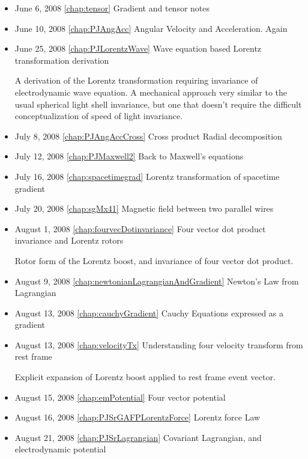 \begin{itemize}
\item June 6, 2008 \ref{chap:tensor} Gradient and tensor notes

\item June 10, 2008 \ref{chap:PJAngAcc} Angular Velocity and Acceleration.  Again

\item June 25, 2008 \ref{chap:PJLorentzWave} Wave equation based Lorentz transformation derivation

A derivation of the Lorentz transformation requiring invariance of electrodynamic wave equation.  A mechanical approach very similar to the usual spherical light shell invariance, but one that doesn't require the difficult conceptualization of speed of light invariance.\item July 8, 2008 \ref{chap:PJAngAccCross} Cross product Radial decomposition

\item July 12, 2008 \ref{chap:PJMaxwell2} Back to Maxwell's equations

\item July 16, 2008 \ref{chap:spacetimegrad} Lorentz transformation of spacetime gradient

\item July 20, 2008 \ref{chap:sgMx41} Magnetic field between two parallel wires

\item August 1, 2008 \ref{chap:fourvecDotinvariance} Four vector dot product invariance and Lorentz rotors

Rotor form of the Lorentz boost, and invariance of four vector dot product.\item August 9, 2008 \ref{chap:newtonianLagrangianAndGradient} Newton's Law from Lagrangian

\item August 13, 2008 \ref{chap:cauchyGradient} Cauchy Equations expressed as a gradient

\item August 13, 2008 \ref{chap:velocityTx} Understanding four velocity transform from rest frame

Explicit expansion of Lorentz boost applied to rest frame event vector.\item August 15, 2008 \ref{chap:emPotential} Four vector potential

\item August 16, 2008 \ref{chap:PJSrGAFPLorentzForce} Lorentz force Law

\item August 21, 2008 \ref{chap:PJSrLagrangian} Covariant Lagrangian, and electrodynamic potential


\end{itemize}
